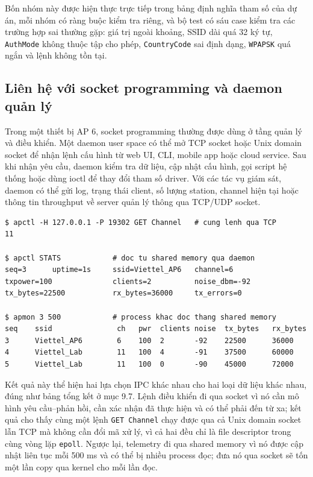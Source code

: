\documentclass[11pt]{article}
\newcommand{\code}[1]{\texttt{#1}}
\begin{document}
Bốn nhóm này được hiện thực trực tiếp trong bảng định nghĩa tham số của dự án, mỗi nhóm có ràng buộc kiểm tra riêng, và bộ test có sáu case kiểm tra các trường hợp sai thường gặp: giá trị ngoài khoảng, SSID dài quá 32 ký tự, \code{AuthMode} không thuộc tập cho phép, \code{CountryCode} sai định dạng, \code{WPAPSK} quá ngắn và lệnh không tồn tại.

\subsection{Liên hệ với socket programming và daemon quản lý}

Trong một thiết bị AP 6, socket programming thường được dùng ở tầng quản lý và điều khiển. Một daemon user space có thể mở TCP socket hoặc Unix domain socket để nhận lệnh cấu hình từ web UI, CLI, mobile app hoặc cloud service. Sau khi nhận yêu cầu, daemon kiểm tra dữ liệu, cập nhật cấu hình, gọi script hệ thống hoặc dùng ioctl để thay đổi tham số driver. Với các tác vụ giám sát, daemon có thể gửi log, trạng thái client, số lượng station, channel hiện tại hoặc thông tin throughput về server quản lý thông qua TCP/UDP socket.

\begin{lstlisting}[caption={Cùng một lệnh qua hai đường truyền, và telemetry qua shared memory}]
$ apctl -H 127.0.0.1 -P 19302 GET Channel   # cung lenh qua TCP
11

$ apctl STATS            # doc tu shared memory qua daemon
seq=3      uptime=1s     ssid=Viettel_AP6   channel=6
txpower=100              clients=2          noise_dbm=-92
tx_bytes=22500           rx_bytes=36000     tx_errors=0

$ apmon 3 500            # process khac doc thang shared memory
seq    ssid               ch   pwr  clients noise  tx_bytes   rx_bytes
3      Viettel_AP6        6    100  2       -92    22500      36000
4      Viettel_Lab        11   100  4       -91    37500      60000
5      Viettel_Lab        11   100  0       -90    45000      72000
\end{lstlisting}

Kết quả này thể hiện hai lựa chọn IPC khác nhau cho hai loại dữ liệu khác nhau, đúng như bảng tổng kết ở mục 9.7. Lệnh điều khiển đi qua socket vì nó cần mô hình yêu cầu--phản hồi, cần xác nhận đã thực hiện và có thể phải đến từ xa; kết quả cho thấy cùng một lệnh \code{GET Channel} chạy được qua cả Unix domain socket lẫn TCP mà không cần đổi mã xử lý, vì cả hai đều chỉ là file descriptor trong cùng vòng lặp \code{epoll}. Ngược lại, telemetry đi qua shared memory vì nó được cập nhật liên tục mỗi 500 ms và có thể bị nhiều process đọc; đưa nó qua socket sẽ tốn một lần copy qua kernel cho mỗi lần đọc.
\end{document}
